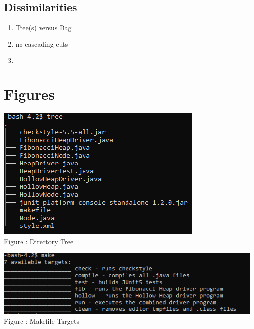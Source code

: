 \documentclass[letter,10pt]{article}
\begin{document}
\subsection{Dissimilarities}
\begin{enumerate}
    \item Tree(s) versus Dag
    \item no cascading cuts
    \item 
\end{enumerate}

\section{Figures}
\begin{center}
	\includegraphics[]{tree.png}\\
	Figure : Directory Tree
\end{center}
\medskip
\begin{center}
	\includegraphics[]{make.png}\\
	Figure :  Makefile Targets
\end{center}

\newpage
\nocite{*}
\printbibliography
\end{document}
